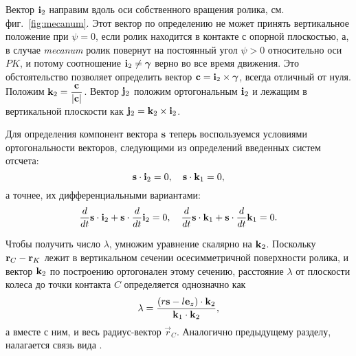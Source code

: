 Вектор ${\bf i}_2$ направим вдоль оси собственного вращения ролика, см. фиг.~\ref{fig:mecanum}. Этот вектор по определению не может принять вертикальное положение при $\psi = 0$, если ролик находится в контакте с опорной плоскостью, а, в случае \textit{mecanum} ролик повернут на постоянный угол $\psi > 0$ относительно оси $PK$, и потому соотношение ${\bf i}_2 \ne \vec{\gamma}$ верно во все время движения. Это обстоятельство позволяет определить вектор ${\bf c} = {\bf i}_2 \times \vec{\gamma}$, всегда отличный от нуля. Положим ${\bf k}_2 = \ddfrac{\vec{c}}{|\vec{c}|}$. Вектор ${\bf j}_2$ положим ортогональным ${\bf i}_2$ и лежащим в вертикальной плоскости как ${\bf j}_2 = {\bf k}_2 \times {\bf i}_2$.

Для определения компонент вектора $\vecrho$ теперь воспользуемся условиями ортогональности векторов, следующими из определений введенных систем отсчета:
$$
    \vecrho \cdot {\bf i}_2 = 0, \quad \vecrho \cdot {\bf k}_1 = 0,
$$
а точнее, их дифференциальными вариантами:
$$
    \dfrac{d}{dt} \vecrho \cdot {\bf i}_2 + \vecrho \cdot \dfrac{d}{dt} {\bf i}_2 = 0, \quad
    \dfrac{d}{dt} \vecrho \cdot {\bf k}_1 + \vecrho \cdot \dfrac{d}{dt} {\bf k}_1 = 0.
$$

Чтобы получить число $\lambda$, умножим уравнение скалярно на ${\bf k}_2$. Поскольку ${\bf r}_C - {\bf r}_K$ лежит в вертикальном сечении осесимметричной поверхности ролика, и вектор ${\bf k}_2$ по построению ортогонален этому сечению, расстояние $\lambda$ от плоскости колеса до точки контакта $C$ определяется однозначно как
$$
    \lambda = \ddfrac
        { \left( r\vec{s} - l\vec{e}_z \right) \cdot \vec{k}_2 }
        { \vec{k}_1 \cdot \vec{k}_2 },
$$
а вместе с ним, и весь радиус-вектор $\vec{r}_C$. Аналогично предыдущему разделу, налагается связь вида .
